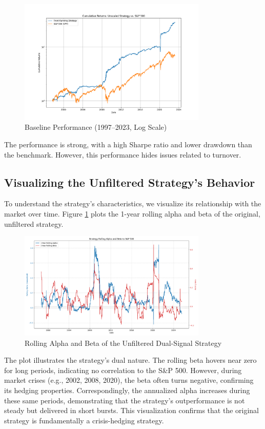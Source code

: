 \documentclass{article}
\begin{document}
\begin{figure}[htbp]
\centering
\includegraphics[width=0.8\textwidth]{plots/performance.png}
\caption{Baseline Performance (1997--2023, Log Scale)}
\end{figure}

The performance is strong, with a high Sharpe ratio and lower drawdown than the benchmark. However, this performance hides issues related to turnover.

\subsection{Visualizing the Unfiltered Strategy's Behavior}
To understand the strategy's characteristics, we visualize its relationship with the market over time. Figure \ref{fig:rolling_metrics} plots the 1-year rolling alpha and beta of the original, unfiltered strategy.

\begin{figure}[htbp]
    \centering
    \includegraphics[width=0.8\textwidth]{plots/plot_rolling_metrics.png}
    \caption{Rolling Alpha and Beta of the Unfiltered Dual-Signal Strategy}
    \label{fig:rolling_metrics}
\end{figure}

The plot illustrates the strategy's dual nature. The rolling beta hovers near zero for long periods, indicating no correlation to the S\&P 500. However, during market crises (e.g., 2002, 2008, 2020), the beta often turns negative, confirming its hedging properties. Correspondingly, the annualized alpha increases during these same periods, demonstrating that the strategy's outperformance is not steady but delivered in short bursts. This visualization confirms that the original strategy is fundamentally a crisis-hedging strategy.
\end{document}
